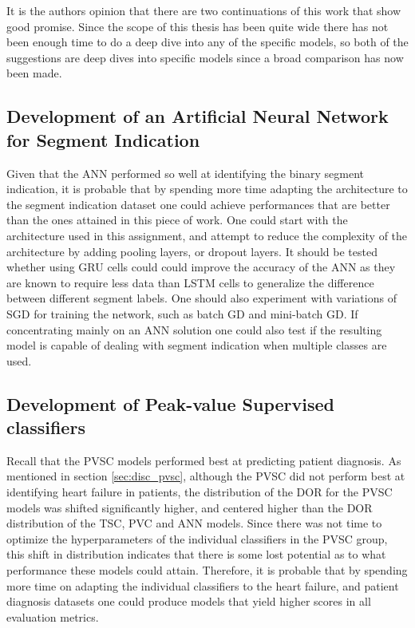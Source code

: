 It is the authors opinion that there are two continuations of this work that show good promise. Since the scope of this thesis has been quite wide there has not been enough time to do a deep dive into any of the specific models, so both of the suggestions are deep dives into specific models since a broad comparison has now been made.

\subsection*{Development of an Artificial Neural Network for Segment Indication}

Given that the ANN performed so well at identifying the binary segment indication, it is probable that by spending more time adapting the architecture to the segment indication dataset one could achieve performances that are better than the ones attained in this piece of work. One could start with the architecture used in this assignment, and attempt to reduce the complexity of the architecture by adding pooling layers, or dropout layers. It should be tested whether using GRU cells could could improve the accuracy of the ANN as they are known to require less data than LSTM cells to generalize the difference between different segment labels. One should also experiment with variations of SGD for training the network, such as batch GD and mini-batch GD. If concentrating mainly on an ANN solution one could also test if the resulting model is capable of dealing with segment indication when multiple classes are used. 

\subsection*{Development of Peak-value Supervised classifiers}

Recall that the PVSC models performed best at predicting patient diagnosis. As mentioned in section \ref{sec:disc_pvsc}, although the PVSC did not perform best at identifying heart failure in patients, the distribution of the DOR for the PVSC models was shifted significantly higher, and centered higher than the DOR distribution of the TSC, PVC and ANN models. Since there was not time to optimize the hyperparameters of the individual classifiers in the PVSC group, this shift in distribution indicates that there is some lost potential as to what performance these models could attain. Therefore, it is probable that by spending more time on adapting the individual classifiers to the heart failure, and patient diagnosis datasets one could produce models that yield higher scores in all evaluation metrics.